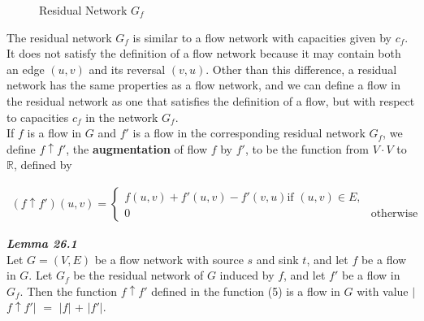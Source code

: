 \begin{figure}[H]
\centering
{} 
\caption{\footnotesize{Residual Network $G_f$}}
\end{figure}

The residual network $G_f$ is similar to a flow network with capacities given by $c_f$. It does not satisfy the definition of a flow network because it may contain both an edge $(u, v)$ and its reversal $(v, u)$. Other than this difference, a residual network has the same properties as a flow network, and we can define a flow in the residual network as one that satisfies the definition of a flow, but with respect to capacities $c_f$ in the network $G_f$.\\

If $f$ is a flow in $G$ and $f'$ is a flow in the corresponding residual network $G_f$, we define $f \uparrow f'$, the \textbf{augmentation} of flow $f$ by $f'$, to be the function from $V \cdot V$ to $\mathbb{R}$, defined by

\begin{align}
 (f \uparrow f')(u, v) =
  \begin{cases}
  	f(u, v) + f'(u, v) - f'(v, u) \text{if } (u,v) \in E, \\
  	0 & \text{otherwise}
  \end{cases}
\end{align}

\newpage
\textbf{\textit{Lemma 26.1}}\\
Let $G = (V, E)$ be a flow network with source $s$ and sink $t$, and let $f$ be a flow in $G$. Let $G_f$ be the residual network of $G$ induced by $f$, and let $f'$ be a flow in $G_f$. Then the function $f \uparrow f'$ defined in the function (5) is a flow in $G$ with value $|$$f \uparrow f'$$|$ $=$ $|$$f$$|$ + $|$$f'$$|$.\\

